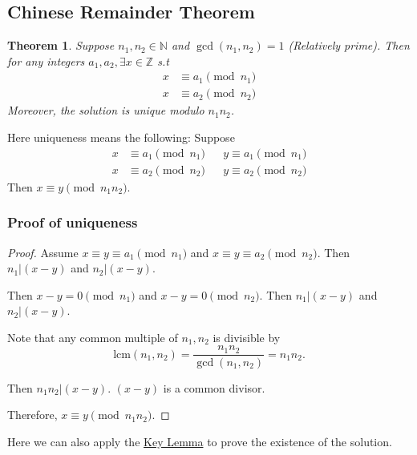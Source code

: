 \documentclass[letterpaper,12pt,oneside]{article}
\newtheorem{theorem}{Theorem}
\begin{document}
\subsection{Chinese Remainder Theorem}
\begin{theorem}
    Suppose $n_1,n_2 \in \mathbb{N}$ and $\gcd(n_1,n_2)=1$ (Relatively prime). Then for any integers $a_1, a_2, \exists x\in \mathbb{Z}$ s.t \begin{align*}
        x & \equiv a_1 \pmod {n_1} \\
        x & \equiv a_2 \pmod {n_2}
    \end{align*}
    Moreover, the solution is unique modulo $n_1n_2$.
\end{theorem}
Here uniqueness means the following: Suppose \begin{align*}
    x & \equiv a_1 \pmod {n_1} &  & y \equiv a_1 \pmod {n_1} \\
    x & \equiv a_2 \pmod {n_2} &  & y \equiv a_2 \pmod {n_2}
\end{align*}
Then $x\equiv y \pmod {n_1n_2}$.
\subsubsection{Proof of uniqueness}
\begin{proof}
    Assume $x\equiv y \equiv a_1 \pmod {n_1}$ and $x\equiv y \equiv a_2 \pmod {n_2}$. Then $n_1 | (x-y)$ and $n_2 | (x-y)$.

    Then $x-y=0\pmod {n_1}$ and $x-y=0\pmod {n_2}$. Then $n_1 | (x-y)$ and $n_2 |
        (x-y)$.

    Note that any common multiple of $n_1,n_2$ is divisible by \[
        \text{lcm}(n_1,n_2)=\frac{n_1 n_2}{\gcd(n_1,n_2)}=n_1n_2.
    \]

    Then $n_1n_2 | (x-y)$. $(x-y)$ is a common divisor.

    Therefore, $x\equiv y \pmod {n_1n_2}$.
\end{proof}
Here we can also apply the \hyperref[sec:key-lemma]{Key Lemma} to prove the existence of the solution.
\end{document}
